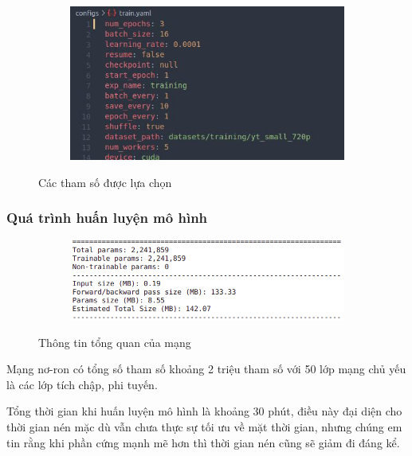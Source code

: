 \begin{figure}
    \begin{subfigure}{0.7\textwidth}
        \includegraphics[width=1.\linewidth]{Chapters/items/pram.jpg}

        \label{fig: param}
    \end{subfigure}
    \caption{Các tham số được lựa chọn}
\end{figure}

\subsubsection{Quá trình huấn luyện mô hình}

\begin{figure}
    \begin{subfigure}{1.\textwidth}
        \includegraphics[width=1.\linewidth]{Chapters/items/model.png}
        \label{fig: model}
    \end{subfigure}
    \caption{Thông tin tổng quan của mạng}
\end{figure}

Mạng nơ-ron có tổng số tham số khoảng 2 triệu tham số với 50 lớp mạng chủ yếu
là các lớp tích chập, phi tuyến.



Tổng thời gian khi huấn luyện mô hình là khoảng 30 phút, điều này
đại diện cho thời gian nén mặc dù vẫn chưa thực sự tối ưu về mặt
thời gian, nhưng chúng em tin rằng khi phần cứng mạnh mẽ hơn thì
thời gian nén cũng sẽ giảm đi đáng kể.

